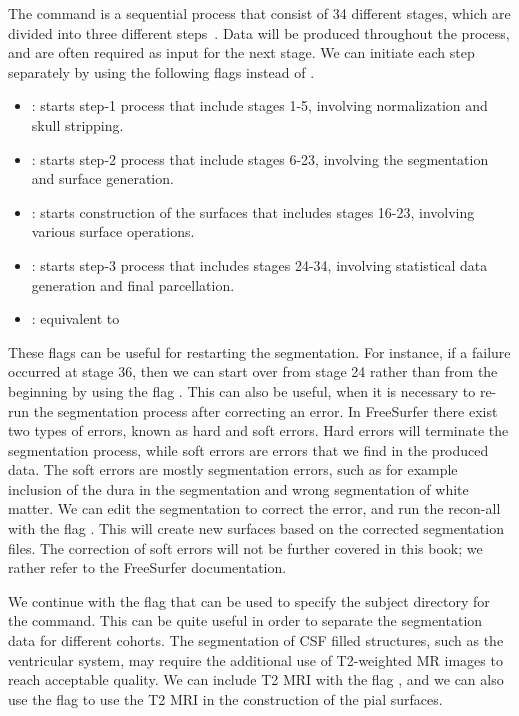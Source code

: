 The command  is a sequential process that consist of 34
different stages, which are divided into three different
steps~\cite{freesurfer-wiki}. Data will be produced throughout the
process, and are often required as input for the next stage. We can
initiate each step separately by using the following flags instead of
.
\begin{itemize}
\item {}: starts step-1 process that include stages 1-5, involving normalization and skull stripping. 
\item {}: starts step-2 process that include stages 6-23, involving the segmentation and surface generation.
\item {}: starts construction of the surfaces that includes stages 16-23, involving various surface operations.  
\item {}: starts step-3 process that includes stages 24-34, involving 
statistical data generation and final parcellation.
\item {}: equivalent to  
\end{itemize} 

These flags can be useful for restarting the segmentation. For
instance, if a failure occurred at stage 36, then we can start over
from stage 24 rather than from the beginning by using the flag
. This can also be useful, when it is necessary to
re-run the segmentation process after correcting an error. In
FreeSurfer there exist two types of errors, known as hard and soft
errors. Hard errors will terminate the segmentation process, while
soft errors are errors that we find in the produced data. The soft
errors are mostly segmentation errors, such as for example inclusion of the dura
in the segmentation and wrong segmentation of white matter. We can
edit the segmentation to correct the error, and run the recon-all with
the flag . This will create new surfaces based
on the corrected segmentation files. The correction of soft errors
will not be further covered in this book; we rather refer to the
FreeSurfer documentation\cite{freesurfer-wiki}.

We continue with the flag  that can be used to specify the
subject directory for the  command. This can be quite
useful in order to separate the segmentation data for different
cohorts. The segmentation of CSF filled structures, such as the
ventricular system, may require the additional use of T2-weighted MR
images to reach acceptable quality. We can include T2 MRI with the
flag , and we can also use the flag  to use
the T2 MRI in the construction of the pial surfaces.

